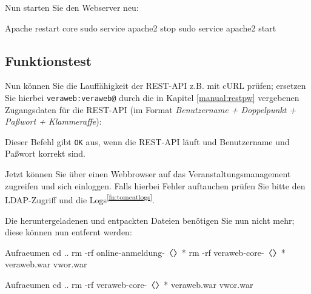 \begin{minipage}{\textwidth}
Nun starten Sie den Webserver neu:

\begin{lstdump}{Apache restart core}
sudo service apache2 stop
sudo service apache2 start
\end{lstdump}
\end{minipage}

\subsection{Funktionstest}\label{subsec:setup-core-check}

\begin{minipage}{\textwidth}
Nun können Sie die Lauffähigkeit der REST-API z.B. mit cURL prüfen;
ersetzen Sie hierbei \texttt{veraweb:veraweb@} durch die in Kapitel
\ref{manual:restpw} vergebenen Zugangsdaten für die REST-API (im
Format {\itshape Benutzername + Doppelpunkt + Paßwort + Klammeraffe}):


Dieser Befehl gibt \texttt{OK} aus, wenn die REST-API läuft und
Benutzername und Paßwort korrekt sind.
\end{minipage}

Jetzt können Sie über einen Webbrowser auf das Veranstaltungsmanagement
zugreifen und sich einloggen. Falls hierbei Fehler auftauchen prüfen Sie
bitte den LDAP-Zugriff und die Logs\Hair\textsuperscript{\ref{fn:tomcatlogs}}.

\begin{minipage}{\textwidth}
Die heruntergeladenen und entpackten Dateien benötigen Sie nun nicht
mehr; diese können nun entfernt werden:

\ifoa
\begin{lstdump}{Aufraeumen}
cd ..
rm -rf online-anmeldung-〈\lstdumpesc{\vwiaverssw}〉*
rm -rf veraweb-core-〈\lstdumpesc{\vwiaverssw}〉* veraweb.war vwor.war
\end{lstdump}
\else%
\begin{lstdump}{Aufraeumen}
cd ..
rm -rf veraweb-core-〈\lstdumpesc{\vwiaverssw}〉* veraweb.war vwor.war
\end{lstdump}
\fi%
\end{minipage}

\ifoa

